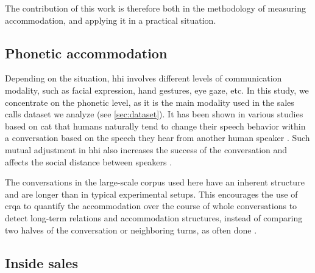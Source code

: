 The contribution of this work is therefore both in the methodology of measuring accommodation, and applying it in a practical situation.


\subsection{Phonetic accommodation}
\label{subsec:phonetic_accommodation}

Depending on the situation, \ac{hhi} involves different levels of communication modality, such as facial expression, hand gestures, eye gaze, etc.
In this study, we concentrate on the phonetic level, as it is the main modality used in the sales calls dataset we analyze (see \cref{sec:dataset}).
It has been shown in various studies based on \ac{cat} \citep{Giles1991CAT,Gallois2015CAT} that humans naturally tend to change their speech behavior within a conversation based on the speech they hear from another human speaker \citep{Bailly2010speech,Babel2014novelty}.
Such mutual adjustment in \ac{hhi} also increases the success of the conversation \citep{Pickering2004behavioral} and affects the social distance between speakers \citep{Schweitzer2017social}.

The conversations in the large-scale corpus used here have an inherent structure and are longer than in typical experimental setups.
This encourages the use of \ac{crqa} to quantify the accommodation over the course of whole conversations to detect long-term relations and accommodation structures, instead of comparing two halves of the conversation or neighboring turns, as often done \citep{Levitan2013entrainment,Rahimi2018weighting}.


\subsection{Inside sales}
\label{subsec:inside_sales}


